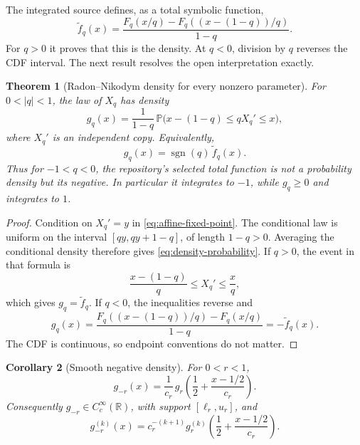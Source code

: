 \documentclass[11pt]{article}
\newtheorem{theorem}{Theorem}[section]
\newtheorem{corollary}[theorem]{Corollary}
\theoremstyle{definition}
\newcommand{\R}{\mathbb R}
\newcommand{\Pp}{\mathbb P}
\newcommand{\sgn}{\operatorname{sgn}}
\begin{document}
The integrated source defines, as a total symbolic function,
\begin{equation}
 \widetilde f_q(x)=
 \frac{F_q(x/q)-F_q((x-(1-q))/q)}{1-q}.                   \label{eq:source-selected-f}
\end{equation}
For \(q>0\) it proves that this is the density.  At \(q<0\), division by \(q\) reverses
the CDF interval.  The next result resolves the open interpretation exactly.

\begin{theorem}[Radon--Nikodym density for every nonzero parameter]\label{thm:all-sign-density}
For \(0<\lvert q\rvert<1\), the law of \(X_q\) has density
\begin{equation}
 g_q(x)=\frac{1}{1-q}\,
 \Pp\bigl(x-(1-q)\le qX_q'\le x\bigr),                  \label{eq:density-probability}
\end{equation}
where \(X_q'\) is an independent copy.  Equivalently,
\begin{equation}
 \boxed{
 g_q(x)=\sgn(q)\,\widetilde f_q(x).}                     \label{eq:density-sign}
\end{equation}
Thus for \(-1<q<0\), the repository's selected total function is not a probability
density but its negative.  In particular it integrates to \(-1\), while \(g_q\ge0\)
and integrates to \(1\).
\end{theorem}

\begin{proof}
Condition on \(X_q'=y\) in \cref{eq:affine-fixed-point}.  The conditional law is uniform
on the interval \([qy,qy+1-q]\), of length \(1-q>0\).  Averaging the conditional density
therefore gives \cref{eq:density-probability}.  If \(q>0\), the event in that formula is
\[
 \frac{x-(1-q)}q\le X_q'\le\frac xq,
\]
which gives \(g_q=\widetilde f_q\).  If \(q<0\), the inequalities reverse and
\[
 g_q(x)=\frac{F_q((x-(1-q))/q)-F_q(x/q)}{1-q}
       =-\widetilde f_q(x).
\]
The CDF is continuous, so endpoint conventions do not matter.
\end{proof}

\begin{corollary}[Smooth negative density]\label{cor:negative-density}
For \(0<r<1\),
\begin{equation}
 \boxed{
 g_{-r}(x)=\frac1{c_r}\,
 g_r\!\left(\frac12+\frac{x-1/2}{c_r}\right).}           \label{eq:negative-density}
\end{equation}
Consequently \(g_{-r}\in C_c^\infty(\R)\), with support \([\ell_r,u_r]\), and
\begin{equation}
 g_{-r}^{(k)}(x)=c_r^{-(k+1)}
 g_r^{(k)}\!\left(\frac12+\frac{x-1/2}{c_r}\right).      \label{eq:negative-derivative}
\end{equation}
\end{corollary}
\end{document}
